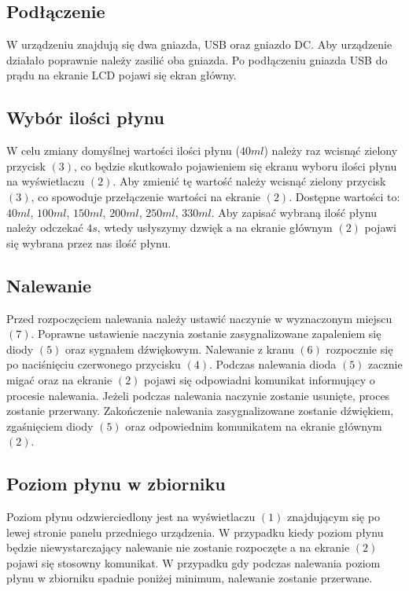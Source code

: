 \documentclass[11pt]{article}
\begin{document}
\subsection{Podłączenie}
W urządzeniu znajdują się dwa gniazda, USB oraz gniazdo DC. Aby urządzenie działało poprawnie należy zasilić oba gniazda. Po podłączeniu gniazda USB do prądu na ekranie LCD pojawi się ekran główny. 

\subsection{Wybór ilości płynu}
W celu zmiany domyślnej wartości ilości płynu ($40ml$) należy raz wcisnąć zielony przycisk $(3)$, co będzie skutkowało pojawieniem się ekranu wyboru ilości płynu na wyświetlaczu $(2)$. Aby zmienić tę wartość należy wcisnąć zielony przycisk $(3)$, co spowoduje przełączenie wartości na ekranie $(2)$. Dostępne wartości to: $40ml$, $100ml$, $150ml$, $200ml$, $250ml$, $330ml$. Aby zapisać wybraną ilość płynu należy odczekać $4s$, wtedy usłyszymy dzwięk a na ekranie głównym $(2)$ pojawi się wybrana przez nas ilość płynu.
\newpage

\subsection{Nalewanie}
Przed rozpoczęciem nalewania należy ustawić naczynie w wyznaczonym miejscu $(7)$. Poprawne ustawienie naczynia zostanie zasygnalizowane zapaleniem się diody $(5)$ oraz sygnałem dźwiękowym. Nalewanie z kranu $(6)$ rozpocznie się po naciśnięciu czerwonego przycisku $(4)$. Podczas nalewania dioda $(5)$ zacznie migać oraz na ekranie $(2)$ pojawi się odpowiadni komunikat informujący o procesie nalewania. Jeżeli podczas nalewania naczynie zostanie usunięte, proces zostanie przerwany. Zakończenie nalewania zasygnalizowane zostanie dźwiękiem, zgaśnięciem diody $(5)$ oraz odpowiednim komunikatem na ekranie głównym $(2)$. 

\subsection{Poziom płynu w zbiorniku}
Poziom płynu odzwierciedlony jest na wyświetlaczu $(1)$ znajdującym się po lewej stronie panelu przedniego urządzenia. W przypadku kiedy poziom płynu będzie niewystarczający nalewanie nie zostanie rozpoczęte a na ekranie $(2)$ pojawi się stosowny komunikat. W przypadku gdy podczas nalewania poziom płynu w zbiorniku spadnie poniżej minimum, nalewanie zostanie przerwane.
\end{document}
